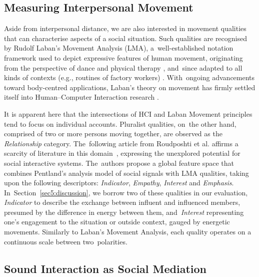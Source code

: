 \subsection*{Measuring Interpersonal Movement}
\label{sec2_measuring}

Aside from interpersonal distance, we are also interested in movement qualities that can characterise aspects of a social situation. Such qualities are recognised by Rudolf Laban’s Movement Analysis (LMA), a~well-established notation framework used to depict expressive features of human movement, originating from the perspective of dance and physical therapy \citep{laban_mastery_1988}, and~since adapted to all kinds of contexts (e.g., routines of factory workers) \citep{davies_beyond_2006}. With~ongoing advancements toward body-centred applications, Laban's theory on movement has firmly settled itself into Human--Computer Interaction research \citep{ziegelmaier_laban_2020}.

It is apparent here that the intersections of HCI and Laban Movement principles tend to focus on individual accounts. Pluralist qualities, on~the other hand, comprised of two or more persons moving together, are observed as the \textit{Relationship} category. The~following article from Roudposhti et al. %
affirms a scarcity of literature in this domain~\cite{roudposhti_parameterizing_2012}, expressing the unexplored potential for social interactive systems. The~authors propose a global feature space that combines Pentland's analysis model of social signals \citep{pentland_honest_2010} with LMA qualities, taking upon the following descriptors: \textit{Indicator}, \textit{Empathy}, \textit{Interest} and \textit{Emphasis}. In~Section~\ref{sec5:discussion}, we borrow two of these qualities in our evaluation, \textit{Indicator} to describe the exchange between influent and influenced members, presumed by the difference in energy between them, and~\textit{Interest} representing one's engagement to the situation or outside context, gauged by energetic movements. Similarly to Laban's Movement Analysis, each quality operates on a continuous scale between two~polarities.

\subsection*{Sound Interaction as Social Mediation}
\label{subsec:soundInteraction}

